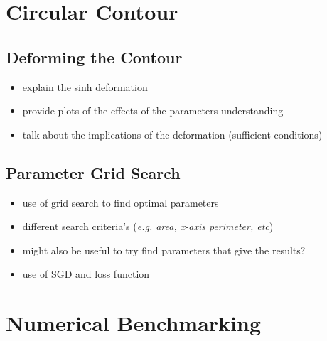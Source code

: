 \documentclass[a4paper]{report}
\begin{document}
\section{Circular Contour}

\subsection{Deforming the Contour}
\begin{itemize}
    \item explain the sinh deformation
    \item provide plots of the effects of the parameters understanding
    \item talk about the implications of the deformation (sufficient conditions)
\end{itemize}

\subsection{Parameter Grid Search}
\begin{itemize}
    \item use of grid search to find optimal parameters
    \item different search criteria's (\textit{e.g. area, x-axis perimeter, etc})
    \item might also be useful to try find parameters that give the results?
    \item use of SGD and loss function
\end{itemize}

\section{Numerical Benchmarking}

\end{document}
